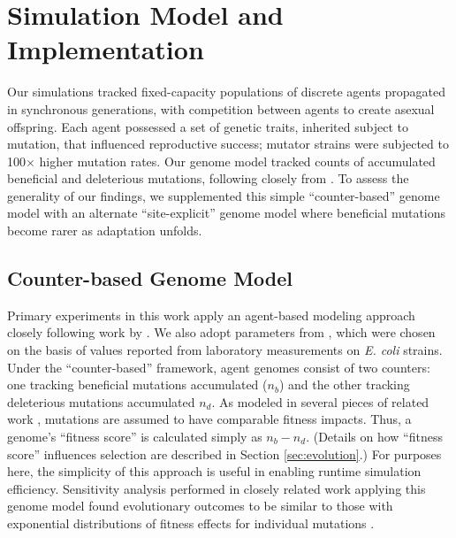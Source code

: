 \section{Simulation Model and Implementation} \label{sec:methods}

Our simulations tracked fixed-capacity populations of discrete agents propagated in synchronous generations, with competition between agents to create asexual offspring.
Each agent possessed a set of genetic traits, inherited subject to mutation, that influenced reproductive success; mutator strains were subjected to 100$\times$ higher mutation rates.
Our genome model tracked counts of accumulated beneficial and deleterious mutations, following closely from \cite{raynes2018sign}.
To assess the generality of our findings, we supplemented this simple ``counter-based'' genome model with an alternate ``site-explicit'' genome model where beneficial mutations become rarer as adaptation unfolds.
%
%
\subsection{Counter-based Genome Model} \label{sec:poisson}

Primary experiments in this work apply an agent-based modeling approach closely following work by \cite{raynes2018sign}.
We also adopt parameters from \cite{raynes2018sign}, which were chosen on the basis of values reported from laboratory measurements on \textit{E. coli} strains\cite{wloch2001direct,frenkel2014fates,joseph2004spontaneous,levy2015quantitative,zeyl2001estimates}.
Under the ``counter-based'' framework, agent genomes consist of two counters: one tracking beneficial mutations accumulated ($n_b$) and the other tracking deleterious mutations accumulated $n_d$.
As modeled in several pieces of related work \cite{tenaillon1999mutators,travis2002mutator,raynes2019migration,tanaka2003evolution,wylie2009fixation}, mutations are assumed to have comparable fitness impacts.
Thus, a genome's ``fitness score'' is calculated simply as $n_b - n_d$.
(Details on how ``fitness score'' influences selection are described in Section \ref{sec:evolution}.)
For purposes here, the simplicity of this approach is useful in enabling runtime simulation efficiency.
Sensitivity analysis performed in closely related work applying this genome model found evolutionary outcomes to be similar to those with exponential distributions of fitness effects for individual mutations \cite{raynes2019selection}.


